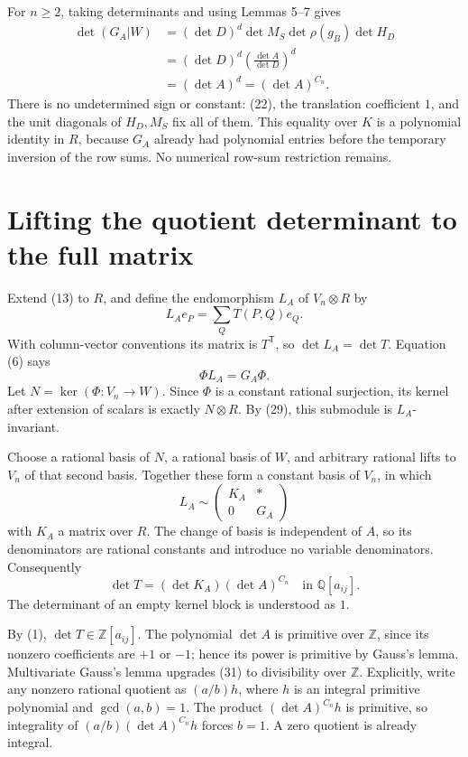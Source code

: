 \documentclass[11pt]{article}
\begin{document}
For \(n\geq2\), taking determinants and using Lemmas 5--7 gives \[
\begin{aligned}
\det(G_A|W)
&=(\det D)^d\det M_S\det\rho(g_B)\det H_D\\
&=(\det D)^d\left(\frac{\det A}{\det D}\right)^d\\
&=(\det A)^d=(\det A)^{C_n}.
\end{aligned}
\tag{27}
\] There is no undetermined sign or constant: (22), the translation coefficient \(1\), and the unit diagonals of \(H_D,M_S\) fix all of them. This equality over \(K\) is a polynomial identity in \(R\), because \(G_A\) already had polynomial entries before the temporary inversion of the row sums. No numerical row-sum restriction remains.

\section{Lifting the quotient determinant to the full matrix}\label{lifting-the-quotient-determinant-to-the-full-matrix}

Extend (13) to \(R\), and define the endomorphism \(L_A\) of \(V_n\otimes R\) by \[
L_Ae_P=\sum_QT(P,Q)e_Q.
\tag{28}
\] With column-vector conventions its matrix is \(T^{\mathsf T}\), so \(\det L_A=\det T\). Equation (6) says \[
\Phi L_A=G_A\Phi.
\tag{29}
\] Let \(N=\ker(\Phi:V_n\to W)\). Since \(\Phi\) is a constant rational surjection, its kernel after extension of scalars is exactly \(N\otimes R\). By (29), this submodule is \(L_A\)-invariant.

Choose a rational basis of \(N\), a rational basis of \(W\), and arbitrary rational lifts to \(V_n\) of that second basis. Together these form a constant basis of \(V_n\), in which \[
L_A\sim\begin{pmatrix}
K_A&*\\
0&G_A
\end{pmatrix}
\tag{30}
\] with \(K_A\) a matrix over \(R\). The change of basis is independent of \(A\), so its denominators are rational constants and introduce no variable denominators. Consequently \[
\det T=(\det K_A)(\det A)^{C_n}
\quad\text{in }\mathbb Q[a_{ij}].
\tag{31}
\] The determinant of an empty kernel block is understood as \(1\).

By (1), \(\det T\in\mathbb Z[a_{ij}]\). The polynomial \(\det A\) is primitive over \(\mathbb Z\), since its nonzero coefficients are \(+1\) or \(-1\); hence its power is primitive by Gauss's lemma. Multivariate Gauss's lemma upgrades (31) to divisibility over \(\mathbb Z\). Explicitly, write any nonzero rational quotient as \((a/b)h\), where \(h\) is an integral primitive polynomial and \(\gcd(a,b)=1\). The product \((\det A)^{C_n}h\) is primitive, so integrality of \((a/b)(\det A)^{C_n}h\) forces \(b=1\). A zero quotient is already integral.
\end{document}
